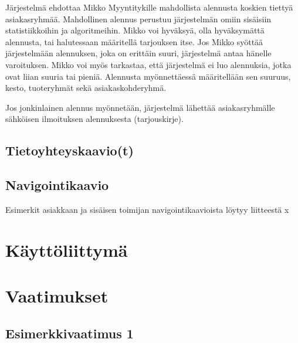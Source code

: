     Järjestelmä ehdottaa Mikko Myyntitykille mahdollista alennusta koskien tiettyä asiakasryhmää.
    Mahdollinen alennus perustuu järjestelmän omiin sisäisiin statistiikkoihin ja algoritmeihin.
    Mikko voi hyväksyä, olla hyväksymättä alennusta, tai halutessaan määritellä tarjouksen itse.
    Jos Mikko syöttää järjestelmään alennuksen, joka on erittäin suuri, järjestelmä antaa hänelle varoituksen.
    Mikko voi myös tarkastaa, että järjestelmä ei luo alennuksia, jotka ovat liian suuria tai pieniä.
    Alennusta myönnettäessä määritellään sen suuruus, kesto, tuoteryhmät sekä asiakaskohderyhmä.

    Jos jonkinlainen alennus myönnetään, järjestelmä lähettää asiakasryhmälle sähköisen ilmoituksen alennuksesta (tarjouskirje).

\subsection{Tietoyhteyskaavio(t)}   %


\subsection{Navigointikaavio}     %
    
    Esimerkit asiakkaan ja sisäisen toimijan navigointikaavioista löytyy liitteestä x   %

\section{Käyttöliittymä}  %



\section{Vaatimukset}       %

    \subsection{Esimerkkivaatimus 1}


